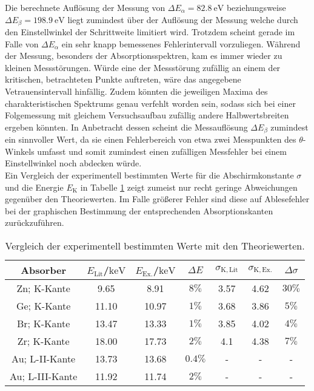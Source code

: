 Die berechnete Auflösung der Messung von $\Delta E_{\alpha}=\SI{82.8}{\electronvolt}$
beziehungsweise $\Delta E_{\beta}=\SI{198.9}{\electronvolt}$ liegt zumindest über der Auflösung der Messung welche durch den Einstellwinkel der Schrittweite limitiert wird.
Trotzdem scheint gerade im Falle von $\Delta E_\alpha$ ein sehr knapp bemessenes Fehlerintervall vorzuliegen.
Während der Messung, besonders der Absorptionsspektren, kam es immer wieder zu kleinen Messstörungen. Würde eine der Messstörung zufällig an einem der kritischen, betrachteten Punkte auftreten, wäre das angegebene Vetrauensintervall hinfällig. Zudem könnten die jeweiligen Maxima des charakteristischen Spektrums genau verfehlt worden sein, sodass sich bei einer Folgemessung mit gleichem Versuchsaufbau zufällig andere Halbwertsbreiten ergeben könnten.
In Anbetracht dessen scheint die Messauflösung $\Delta E_{\beta}$ zumindest ein sinnvoller Wert, da sie einen Fehlerbereich von etwa zwei Messpunkten des $\theta$-Winkels umfasst und somit zumindest einen zufälligen Messfehler bei einem Einstellwinkel noch abdecken würde.\\
Ein Vergleich der experimentell bestimmten Werte für die Abschirmkonstante $\sigma$ und die Energie $E_\mathrm{K}$ in Tabelle \ref{tab:theo} zeigt zumeist nur recht geringe Abweichungen gegenüber den Theoriewerten.
Im Falle größerer Fehler sind diese auf Ablesefehler bei der graphischen Bestimmung der entsprechenden Absorptionskanten zurückzuführen.
\begin{table}
	\caption{Vergleich der experimentell bestimmten Werte mit den Theoriewerten.}
	\label{tab:theo}
	\centering
\begin{tabular}{ccccccc}
\toprule
Absorber & $E_\mathrm{Lit}$/$\si{\kilo\electronvolt}$& $E_\mathrm{Ex.}$/$\si{\kilo\electronvolt}$&$\Delta E$ &$\sigma_\mathrm{K,Lit}$ &$\sigma_\mathrm{K,Ex.}$&$\Delta \sigma$ \\
\midrule
Zn; K-Kante & 9.65     & 8.91 &$8\%$& 3.57       &  4.62         &$   30\%$ \\
Ge; K-Kante & 11.10    & 10.97 & $1\%$&      3.68       & 3.86    &$   5\%$  \\
Br; K-Kante & 13.47    & 13.33 & $1\%$&      3.85       & 4.02    &$   4\%$  \\
Zr; K-Kante & 18.00    & 17.73 & $2\%$&      4.1        &4.38     &$   7\%$  \\
Au; L-II-Kante& 13.73  & 13.68 & $0.4\%$&      -      &  -  & - \\
Au; L-III-Kante& 11.92 &  11.74& $2\%$&      -     &  -  & - \\
\bottomrule
\end{tabular}
\end{table}

